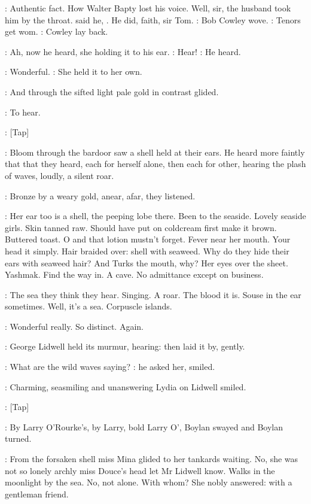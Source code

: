\BloomInt:
Authentic fact.
How Walter Bapty lost his voice.
Well, sir, the husband took him by the throat.
said he,
.
He did, faith, sir Tom.
:
Bob Cowley wove.
\BloomInt:
Tenors get wom.
:
Cowley lay back.

:
Ah, now he heard, she holding it to his ear.
\MissD:
Hear!
:
He heard.

\lidwell:
Wonderful.
:
She held it to her own.

:
And through the sifted light pale gold
in contrast glided.

\BloomInt:
To hear.

\stripling:
[Tap]

:
Bloom through the bardoor saw a shell held at their ears. He heard
more faintly that that they heard, each for herself alone, then each for
other, hearing the plash of waves, loudly, a silent roar.

:
Bronze by a weary gold, anear, afar, they listened.

\BloomInt:
Her ear too is a shell, the peeping lobe there. Been to the seaside.
Lovely seaside girls. Skin tanned raw. Should have put on coldcream first
make it brown.
Buttered toast. O and that lotion mustn't forget. Fever
near her mouth. Your head it simply. Hair braided over: shell with
seaweed. Why do they hide their ears with seaweed hair? And Turks the
mouth, why? Her eyes over the sheet. Yashmak. Find the way in. A cave. No
admittance except on business.

\BloomInt:
The sea they think they hear. Singing. A roar. The blood it is. Souse
in the ear sometimes. Well, it's a sea. Corpuscle islands.

\lidwell:
Wonderful really. So distinct. Again.

:
George Lidwell held its murmur,
hearing: then laid it by, gently.

\lidwell:
What are the wild waves saying?
:
he asked her, smiled.

:
Charming, seasmiling and unanswering
Lydia on Lidwell smiled.

\stripling:
[Tap]

:
By Larry O'Rourke's, by Larry, bold Larry O', Boylan swayed and
Boylan turned.

:
From the forsaken shell miss Mina glided to her tankards waiting.
No, she was not so lonely archly miss Douce's head let Mr Lidwell know.
Walks in the moonlight by the sea. No, not alone. With whom? She nobly
answered: with a gentleman friend.

